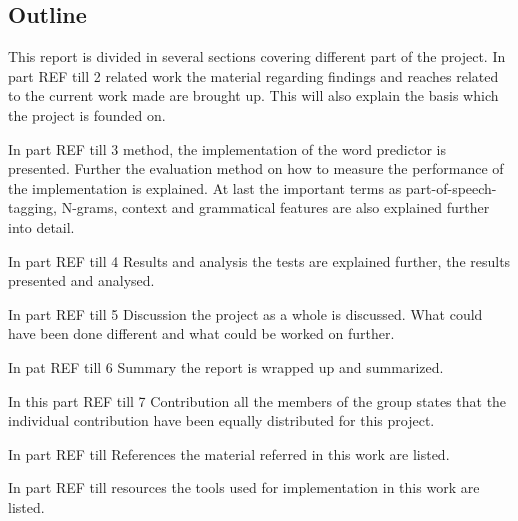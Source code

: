 \subsection{Outline}

This report is divided in several sections covering different part of the project. 
In part {REF till 2 related work} the material regarding findings and reaches  related to the current work made are brought up. This will also explain the basis which the project is founded on.   

In part {REF till 3 method}, the implementation of the word predictor is presented. Further the evaluation method  on how to measure the performance  of the implementation is explained. At last the important terms as part-of-speech-tagging, N-grams, context and grammatical features are also explained further into detail. 

In part {REF till 4 Results and analysis} the tests are explained further, the results presented and analysed.

In part {REF till 5 Discussion} the project as a whole is discussed. What could have been done different and what could be worked on further.

In pat {REF till 6 Summary} the report is wrapped up and summarized.

In this part {REF till 7 Contribution} all the members of the group states that the individual contribution have been equally distributed for this project.

In part {REF till References} the material referred in this work are listed.

In part {REF till resources} the tools used for implementation in this work are listed. 